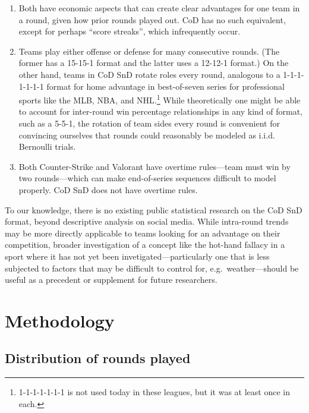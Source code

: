 \documentclass{article}
\providecommand{\tightlist}{%
  \setlength{\itemsep}{0pt}\setlength{\parskip}{0pt}}
\begin{document}
\begin{enumerate}
\def\labelenumi{\arabic{enumi}.}
\tightlist
\item
  Both have economic aspects that can create clear advantages for one
  team in a round, given how prior rounds played out. CoD has no such
  equivalent, except for perhaps ``score streaks'', which infrequently
  occur.
\item
  Teams play either offense or defense for many consecutive rounds. (The
  former has a 15-15-1 format and the latter uses a 12-12-1 format.) On
  the other hand, teams in CoD SnD rotate roles every round, analogous
  to a 1-1-1-1-1-1-1 format for home advantage in best-of-seven series
  for professional sports like the MLB, NBA, and NHL.\footnote{1-1-1-1-1-1-1
    is not used today in these leagues, but it was at least once in
    each.} While theoretically one might be able to account for
  inter-round win percentage relationships in any kind of format, such
  as a 5-5-1, the rotation of team sides every round is convenient for
  convincing ourselves that rounds could reasonably be modeled as i.i.d.
  Bernoulli trials.
\item
  Both Counter-Strike and Valorant have overtime rules---team must win
  by two rounds---which can make end-of-series sequences difficult to
  model properly. CoD SnD does not have overtime rules.
\end{enumerate}

To our knowledge, there is no existing public statistical research on
the CoD SnD format, beyond descriptive analysis on social media. While
intra-round trends may be more directly applicable to teams looking for
an advantage on their competition, broader investigation of a concept
like the hot-hand fallacy in a sport where it has not yet been
invetigated---particularly one that is less subjected to factors that
may be difficult to control for, e.g.~weather---should be useful as a
precedent or supplement for future researchers.

\hypertarget{methodology}{%
\section{Methodology}\label{methodology}}

\hypertarget{distribution-of-rounds-played}{%
\subsection{Distribution of rounds
played}\label{distribution-of-rounds-played}}
\end{document}
